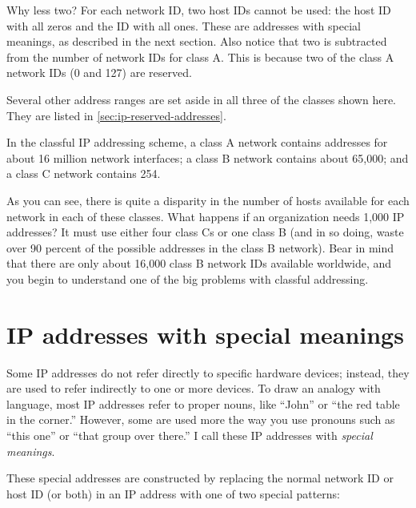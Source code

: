 Why less two?
For each network ID, two host IDs cannot be used: the host ID with all zeros and the ID with all ones.
These are addresses with special meanings, as described in the next section.
Also notice that two is subtracted from the number of network IDs for class A.
This is because two of the class A network IDs (0 and 127) are reserved.

Several other address ranges are set aside in all three of the classes shown here.
They are listed in \vref{sec:ip-reserved-addresses}.


\begin{keyconcept}
In the classful IP addressing scheme, a class A network contains addresses for about 16 million network interfaces;
a class B network contains about 65,000;
and a class C network contains 254.
\end{keyconcept}


As you can see, there is quite a disparity in the number of hosts available for each network in each of these classes.
What happens if an organization needs 1,000 IP addresses?
It must use either four class Cs or one class B (and in so doing, waste over 90 percent of the possible addresses in the class B network).
Bear in mind that there are only about 16,000 class B network IDs available worldwide, and you begin to understand one of the big problems with classful addressing.


\section{IP addresses with special meanings}

Some IP addresses do not refer directly to specific hardware devices; instead, they are used to refer indirectly to one or more devices.
To draw an analogy with language, most IP addresses refer to proper nouns, like ``John'' or ``the red table in the corner.''
However, some are used more the way you use pronouns such as ``this one'' or ``that group over there.''
I call these IP addresses with \emph{special meanings}.

These special addresses are constructed by replacing the normal network ID or host ID (or both) in an IP address with one of two special patterns:

